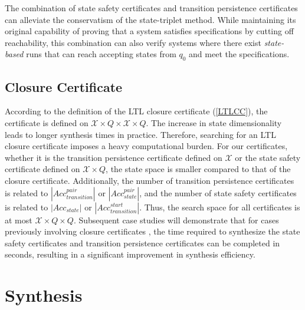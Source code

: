\documentclass[acmlarge]{acmart}
\begin{document}

The combination of state safety certificates and transition persistence certificates can alleviate the conservatism of the state-triplet method. While maintaining its original capability of proving that a system satisfies specifications by cutting off reachability, this combination can also verify systems where there exist \emph{state-based} runs that can reach accepting states from $q_0$ and meet the specifications.

\subsection{Closure Certificate}
According to the definition of the LTL closure certificate (\ref{LTLCC}), the certificate is defined on $\mathcal{X} \times Q \times \mathcal{X} \times Q$. The increase in state dimensionality leads to longer synthesis times in practice. Therefore, searching for an LTL closure certificate imposes a heavy computational burden. For our certificates, whether it is the transition persistence certificate defined on $\mathcal{X}$ or the state safety certificate defined on $\mathcal{X} \times Q$, the state space is smaller compared to that of the closure certificate. Additionally, the number of transition persistence certificates is related to $|Acc_{transition}^{pair}|$ or $|Acc_{state}^{pair}|$, and the number of state safety certificates is related to $|Acc_{state}|$ or $|Acc_{transition}^{start}|$. Thus, the search space for all certificates is at most $\mathcal{X} \times Q \times Q$. Subsequent case studies will demonstrate that for cases previously involving closure certificates \cite{murali2024closure}, the time required to synthesize the state safety certificates and transition persistence certificates can be completed in seconds, resulting in a significant improvement in synthesis efficiency.

\section{Synthesis}
\end{document}
